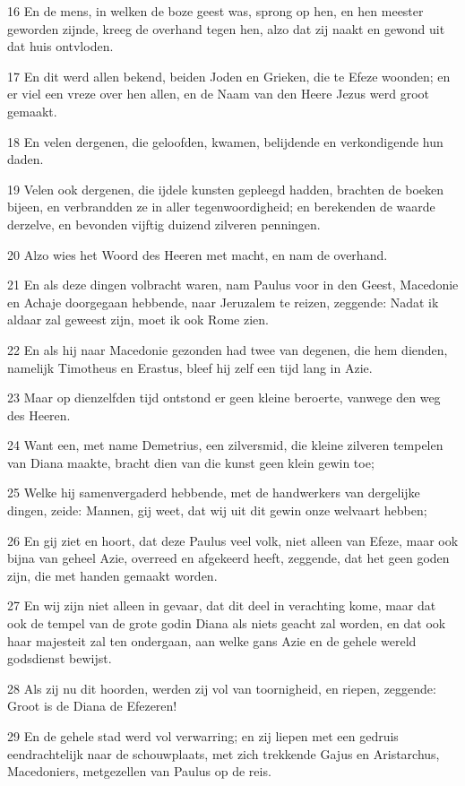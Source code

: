 \par 16 En de mens, in welken de boze geest was, sprong op hen, en hen meester geworden zijnde, kreeg de overhand tegen hen, alzo dat zij naakt en gewond uit dat huis ontvloden.
\par 17 En dit werd allen bekend, beiden Joden en Grieken, die te Efeze woonden; en er viel een vreze over hen allen, en de Naam van den Heere Jezus werd groot gemaakt.
\par 18 En velen dergenen, die geloofden, kwamen, belijdende en verkondigende hun daden.
\par 19 Velen ook dergenen, die ijdele kunsten gepleegd hadden, brachten de boeken bijeen, en verbrandden ze in aller tegenwoordigheid; en berekenden de waarde derzelve, en bevonden vijftig duizend zilveren penningen.
\par 20 Alzo wies het Woord des Heeren met macht, en nam de overhand.
\par 21 En als deze dingen volbracht waren, nam Paulus voor in den Geest, Macedonie en Achaje doorgegaan hebbende, naar Jeruzalem te reizen, zeggende: Nadat ik aldaar zal geweest zijn, moet ik ook Rome zien.
\par 22 En als hij naar Macedonie gezonden had twee van degenen, die hem dienden, namelijk Timotheus en Erastus, bleef hij zelf een tijd lang in Azie.
\par 23 Maar op dienzelfden tijd ontstond er geen kleine beroerte, vanwege den weg des Heeren.
\par 24 Want een, met name Demetrius, een zilversmid, die kleine zilveren tempelen van Diana maakte, bracht dien van die kunst geen klein gewin toe;
\par 25 Welke hij samenvergaderd hebbende, met de handwerkers van dergelijke dingen, zeide: Mannen, gij weet, dat wij uit dit gewin onze welvaart hebben;
\par 26 En gij ziet en hoort, dat deze Paulus veel volk, niet alleen van Efeze, maar ook bijna van geheel Azie, overreed en afgekeerd heeft, zeggende, dat het geen goden zijn, die met handen gemaakt worden.
\par 27 En wij zijn niet alleen in gevaar, dat dit deel in verachting kome, maar dat ook de tempel van de grote godin Diana als niets geacht zal worden, en dat ook haar majesteit zal ten ondergaan, aan welke gans Azie en de gehele wereld godsdienst bewijst.
\par 28 Als zij nu dit hoorden, werden zij vol van toornigheid, en riepen, zeggende: Groot is de Diana de Efezeren!
\par 29 En de gehele stad werd vol verwarring; en zij liepen met een gedruis eendrachtelijk naar de schouwplaats, met zich trekkende Gajus en Aristarchus, Macedoniers, metgezellen van Paulus op de reis.

